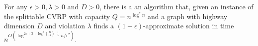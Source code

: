 \documentclass[twoside,leqno]{article}
\newcommand{\calT}{{\cal T}}
\newcommand{\opt}{\mbox{\sc opt}}
\newcommand{\OPT}{\mbox{\sc OPT}}
\newcommand{\eps}{\epsilon}
\newcommand{\cost}{\text{cost}}
\DeclarePairedDelimiter\autobracket{(}{)}
\newcommand{\br}[1]{\autobracket*{#1}}
\begin{document}
\begin{theorem}
For any $\eps > 0, \lambda > 0$ and $D > 0$, there is a an algorithm that, given an instance of the splittable CVRP with capacity $Q = n^{\log^c n}$ and a graph with highway dimension $D$ and violation $\lambda$ finds
a $(1+\eps)$-approximate solution in time $n^{O( \log^{2c + 3 + \log^2(\frac{D}{\eps \lambda})\cdot \frac{1}{\lambda}}n/\eps^2)}$.
\end{theorem}
\begin{comment}
\begin{proof}
Let $\OPT_H$ be the optimal solution in the host graph $H$, which is the bounded treewidth graph and let $\OPT_G$ be the optimal solution in the original graph $G$. Let $\opt_G$ and $\opt_H$ denote the cost of the optimal solutions in graph $G$ and $H$. A tour is a set of edges denoting the order in which nodes are visited. Let $\cost_G(\OPT)$ denote the cost of the set of tours in $\OPT$ when used on graph $G$. Our goal is to show that $\cost_G(\OPT_H) \le (1 + \eps)\cost_G(\OPT(G)) \le (1 + \eps)\opt$.

We will use the embedding presented by Lemma \ref{lem:highway-embe} to embed $G$ into $H$ and use the fact that for any two nodes $u,v$, on expectation
$$d_G(u,v) \le d_H(u,v) \le (1 + \eps) d_G(u,v).$$
Note that the vertices are the same in both $H$ and $G$, so a solution to an instance in $H$ is also a solution in $G$ (and vice versa). Since $d_G(u,v) \le d_H(u,v)$, we know for any solution $\OPT$, $\cost_G(\OPT) \le \cost_H(\OPT)$. Note that $\cost_H(\OPT_H) \le \cost_H(\OPT_G)$.
\begin{equation*}
    \begin{split}
        \cost_G(\OPT_H) & \le \cost_H(\OPT_H) \le \cost_H(\OPT_G) \\
        & = \sum_{\calT_i \in \OPT_G} \cost_H(\calT_i) =\sum_{\calT_i \in \OPT_G}\sum_{uv \in E(\calT_i)} d_H(u,v) \\
        & \le \sum_{\calT_i \in \OPT_G}\sum_{uv \in E(\calT_i)} (1 + \eps) d_G(u,v) \\
        & = (1 + \eps) \sum_{\calT_i \in \OPT_G} \cost_G(\calT_i) \\
        & = (1 + \eps)\cost_G(\OPT_G) \\
    \end{split}
\end{equation*}
Hence, for an appropriate choice of $\eps$, we can find a $(1 + \eps)$-approximation for a graph $G$ which has bounded highway dimension. Recall that the time complexity of for splittable CVRP on bounded treewidth graphs is $n^{O(k^2 \log^{2c + 3}n/\eps^2)}$. Since the treewidth of $H$, $k \le (\log \Delta)^{O\br{\log^2(\frac{D}{\eps \lambda})/\lambda}}$, we get that the running time of our algorithm is $n^{O( \log^{2c + 3 + \log^2(\frac{D}{\eps \lambda})\cdot \frac{1}{\lambda}}n/\eps^2)}$.
\end{proof}
\end{comment}
\end{document}
